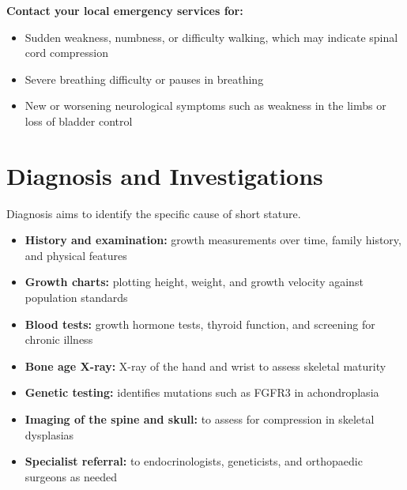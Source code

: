 \textbf{Contact your local emergency services for:}
\begin{itemize}
    \item Sudden weakness, numbness, or difficulty walking, which may indicate spinal cord compression
    \item Severe breathing difficulty or pauses in breathing
    \item New or worsening neurological symptoms such as weakness in the limbs or loss of bladder control
\end{itemize}

\section*{Diagnosis and Investigations}
Diagnosis aims to identify the specific cause of short stature.
\begin{itemize}
    \item \textbf{History and examination:} growth measurements over time, family history, and physical features
    \item \textbf{Growth charts:} plotting height, weight, and growth velocity against population standards
    \item \textbf{Blood tests:} growth hormone tests, thyroid function, and screening for chronic illness
    \item \textbf{Bone age X-ray:} X-ray of the hand and wrist to assess skeletal maturity
    \item \textbf{Genetic testing:} identifies mutations such as FGFR3 in achondroplasia
    \item \textbf{Imaging of the spine and skull:} to assess for compression in skeletal dysplasias
    \item \textbf{Specialist referral:} to endocrinologists, geneticists, and orthopaedic surgeons as needed
\end{itemize}

